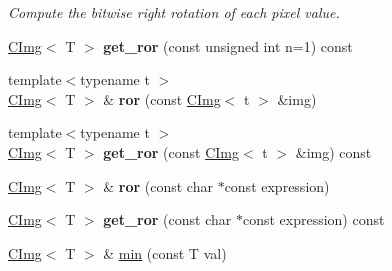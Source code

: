 \begin{DoxyCompactItemize}
\begin{DoxyCompactList}\small\item\em Compute the bitwise right rotation of each pixel value. \item\end{DoxyCompactList}\item 
\hypertarget{structcimg__library_1_1CImg_ae9046bb16eda17aa678f63311a6971d9}{
\hyperlink{structcimg__library_1_1CImg}{CImg}$<$ T $>$ {\bfseries get\_\-ror} (const unsigned int n=1) const }
\label{structcimg__library_1_1CImg_ae9046bb16eda17aa678f63311a6971d9}

\item 
\hypertarget{structcimg__library_1_1CImg_aff9c305e80667a94944adc49a4493a7f}{
{\footnotesize template$<$typename t $>$ }\\\hyperlink{structcimg__library_1_1CImg}{CImg}$<$ T $>$ \& {\bfseries ror} (const \hyperlink{structcimg__library_1_1CImg}{CImg}$<$ t $>$ \&img)}
\label{structcimg__library_1_1CImg_aff9c305e80667a94944adc49a4493a7f}

\item 
\hypertarget{structcimg__library_1_1CImg_a3f518e4c67c0dd9734a9c362d50978d0}{
{\footnotesize template$<$typename t $>$ }\\\hyperlink{structcimg__library_1_1CImg}{CImg}$<$ T $>$ {\bfseries get\_\-ror} (const \hyperlink{structcimg__library_1_1CImg}{CImg}$<$ t $>$ \&img) const }
\label{structcimg__library_1_1CImg_a3f518e4c67c0dd9734a9c362d50978d0}

\item 
\hypertarget{structcimg__library_1_1CImg_afe2a740085558e92c5758f0a4e3842e6}{
\hyperlink{structcimg__library_1_1CImg}{CImg}$<$ T $>$ \& {\bfseries ror} (const char $\ast$const expression)}
\label{structcimg__library_1_1CImg_afe2a740085558e92c5758f0a4e3842e6}

\item 
\hypertarget{structcimg__library_1_1CImg_a7ca04007e3d2854df12512099fce2b3a}{
\hyperlink{structcimg__library_1_1CImg}{CImg}$<$ T $>$ {\bfseries get\_\-ror} (const char $\ast$const expression) const }
\label{structcimg__library_1_1CImg_a7ca04007e3d2854df12512099fce2b3a}

\item 
\hypertarget{structcimg__library_1_1CImg_a24f04a40c39adc99e49ca7c5d3f3d322}{
\hyperlink{structcimg__library_1_1CImg}{CImg}$<$ T $>$ \& \hyperlink{structcimg__library_1_1CImg_a24f04a40c39adc99e49ca7c5d3f3d322}{min} (const T val)}
\label{structcimg__library_1_1CImg_a24f04a40c39adc99e49ca7c5d3f3d322}


\end{DoxyCompactItemize}
